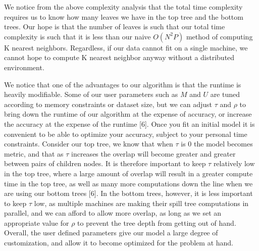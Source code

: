 \vspace{5 mm}
\noindent
We notice from the above complexity analysis that the total time complexity 
requires us to know how many leaves we have in the top tree and the bottom 
trees. Our hope is that the number of leaves is such that our total time 
complexity is such that it is less than our naive $O(N^{2} P)$ method of 
computing K nearest neighbors. Regardless, if our data cannot fit on a single 
machine, we cannot hope to compute K nearest neighbor anyway without a 
distributed environment.

\vspace{5 mm}
\noindent
We notice that one of the advantages to our algorithm is that the runtime is heavily 
modifiable.  Some of our user parameters such as $M$ and $U$ are tuned according
to memory constraints or dataset size, but we can adjust $\tau$ and $\rho$ to 
bring down the runtime of our algorithm at the expense of accuracy, or increase 
the accuracy at the expense of the runtime [6].  Once you fit an initial model it is 
convenient to be able to optimize your accuracy, subject to your personal time 
constraints.  Consider our top tree, we know that when $\tau$ is 0 the model 
becomes metric, and that as $\tau$ increases the overlap will become greater and 
greater between pairs of children nodes.  It is therefore important to keep 
$\tau$ relatively low in the top tree, where a large amount of overlap will 
result in a greater compute time in the top tree, as well as many more 
computations down the line when we are using our bottom trees [6].  In the bottom 
trees, however, it is less important to keep $\tau$ low, as multiple machines 
are making their spill tree computations in parallel, and we can afford to allow 
more overlap, as long as we set an appropriate value for $\rho$ to prevent the 
tree depth from getting out of hand.  Overall, the user defined parameters give 
our model a large degree of customization, and allow it to become optimized for 
the problem at hand.
